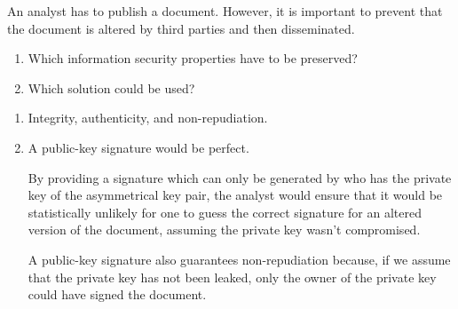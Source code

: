 \begin{Exercise}
An analyst has to publish a document.
However, it is important to prevent that the document is altered by third parties and then disseminated.
\begin{enumerate}
\item Which information security properties have to be preserved?
\item Which solution could be used?
\end{enumerate}
\end{Exercise}
\begin{Answer}
\begin{enumerate}
\item Integrity, authenticity, and non-repudiation.
\item A public-key signature would be perfect.

By providing a signature which can only be generated by who has the private key of the asymmetrical key pair, the analyst would ensure that it would be statistically unlikely for one to guess the correct signature for an altered version of the document, assuming the private key wasn't compromised.

A public-key signature also guarantees non-repudiation because, if we assume that the private key has not been leaked, only the owner of the private key could have signed the document.
\end{enumerate}
\end{Answer}

\begin{Exercise}
\end{Exercise}

\begin{Exercise}
\end{Exercise}

\begin{Exercise}
\end{Exercise}

